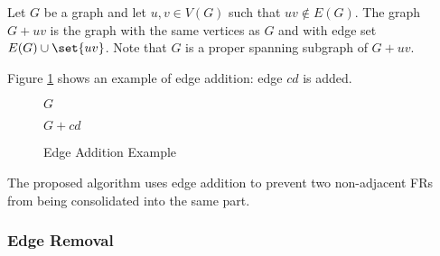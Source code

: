 Let \(G\) be a graph and let \(u,v\in V(G)\) such that \(uv\notin E(G)\).  The graph \(G+uv\) is the graph with the
same vertices as \(G\) and with edge set \(E(G)\cup\set{uv}\).  Note that \(G\) is a proper spanning subgraph of
\(G+uv\).

Figure \ref{fig:eadd} shows an example of edge addition: edge \(cd\) is added.

\begin{figure}[h]
  \label{fig:eadd}
  \begin{minipage}{3in}
    \begin{center}

      \bigskip

      \(G\)
    \end{center}
  \end{minipage}
  \begin{minipage}{3in}
    \begin{center}

      \bigskip

      \(G+cd\)
    \end{center}
  \end{minipage}
  \caption{Edge Addition Example}
\end{figure}

The proposed algorithm uses edge addition to prevent two non-adjacent FRs from being consolidated into the same
part.

\subsubsection{Edge Removal}

